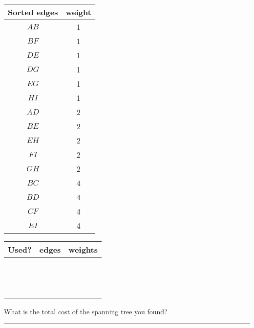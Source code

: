 \documentclass[12pt]{article}
\newcommand{\ans}[1][1in]{\rule{#1}{.5pt}}
\begin{document}
\begin{enumerate}
\begin{adjustbox}{valign=t,minipage={.4\textwidth}}
\end{adjustbox}

\vspace{1cm}

\begin{adjustbox}{valign=t,minipage={.1\linewidth}}
\begin{tabular}{ c | c}
Sorted edges & weight\\ \hline
$AB$ & 1 \\
$BF$ & 1 \\
$DE$ & 1 \\
$DG$ & 1\\
$EG$ & 1\\
$HI$ & 1 \\
$AD$ & 2 \\
$BE$ & 2 \\ 
$EH$ & 2\\
$FI$ & 2\\
$GH$ & 2\\
$BC$ & 4 \\
$BD$ & 4 \\ 
$CF$ & 4\\
$EI$ & 4 \\

 \end{tabular}
 \end{adjustbox}
 \hfill
\begin{adjustbox}{valign=t,minipage={.6\linewidth}}
\begin{tabular}{ c | p{1.5in} | p{1.5in}}
Used? &edges & weights\\ \hline
& \\
& \\
& \\& \\& \\& \\& \\& \\& \\& \\& \\& \\ & \\& \\
 \end{tabular}
 \end{adjustbox}

 
\vspace{1cm}

 
 What is the total cost of the spanning tree you found? \ans
 
\end{enumerate}
\end{document}
